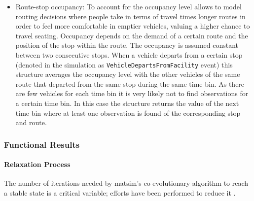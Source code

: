 \begin{itemize}
%
\item Route-stop occupancy: To account for the occupancy level allows to model routing decisions where people take in terms of travel times longer routes in order to feel more comfortable in emptier vehicles, \eg valuing a higher chance to travel seating. Occupancy depends on the demand of a certain route and the position of the stop within the route. The occupancy is assumed constant between two consecutive stops. When a vehicle departs from a certain stop (denoted in the simulation as \lstinline|VehicleDepartsFromFacility| event) this structure averages the occupancy level with the other vehicles of the same route that departed from the same stop during the same time bin. As there are few vehicles for each time bin it is very likely not to find observations for a certain time bin. In this case the structure returns the value of the next time bin where at least one observation is found of the corresponding stop and route.
\end{itemize}

\subsubsection{Functional Results}
\paragraph{Relaxation Process}

The number of iterations needed by \gls{matsim}'s co-evolutionary algorithm to reach a stable state is a critical variable; efforts have been performed to reduce it \citep{MeisterEtAl_STRC_2006, FourieEtAl_TRB_2013}.

